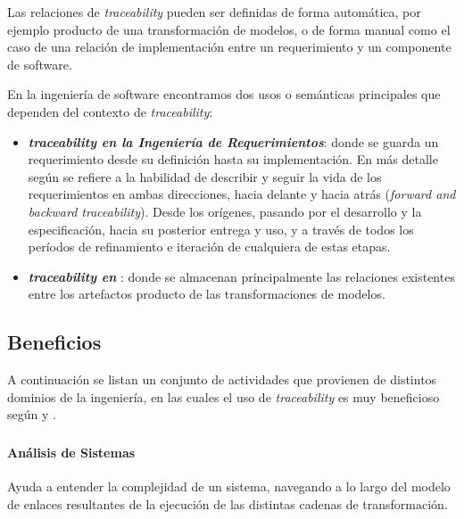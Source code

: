 \documentclass[a4paper,12pt,oneside,spanish]{book}
\begin{document}
Las relaciones de \textit{traceability} pueden ser definidas de forma automática, por ejemplo producto de una transformación de modelos, o de forma manual como el caso de una relación de implementación entre un requerimiento y un componente de software.

En la ingeniería de software encontramos dos usos o semánticas principales que dependen del contexto de \textit{traceability}:

\begin{itemize}

\item \textit{\textbf{traceability en la Ingeniería de Requerimientos}}: donde se guarda un requerimiento desde su definición hasta su implementación. En más detalle según \cite{GotelFinkelstein} se refiere a la habilidad de describir y seguir la vida de los requerimientos en ambas direcciones, hacia delante y hacia atrás (\textit{forward and backward traceability}). Desde los orígenes, pasando por el desarrollo y la especificación, hacia su posterior entrega y uso, y a través de todos los períodos de refinamiento e iteración de cualquiera de estas etapas.

\item \textit{\textbf{traceability en }}: donde se almacenan principalmente las relaciones existentes entre los artefactos producto de las transformaciones de modelos.

\end{itemize}

\subsection{Beneficios}

A continuación se listan un conjunto de actividades que provienen de distintos dominios de la ingeniería, en las cuales el uso de \textit{traceability} es muy beneficioso según \cite{BrcinaRiebisch} y \cite{GrammelVoigt}.

\subsubsection{}

\paragraph{Análisis de Sistemas} Ayuda a entender la complejidad de un sistema, navegando a lo largo del modelo de enlaces resultantes de la ejecución de las distintas cadenas de transformación.
\end{document}
